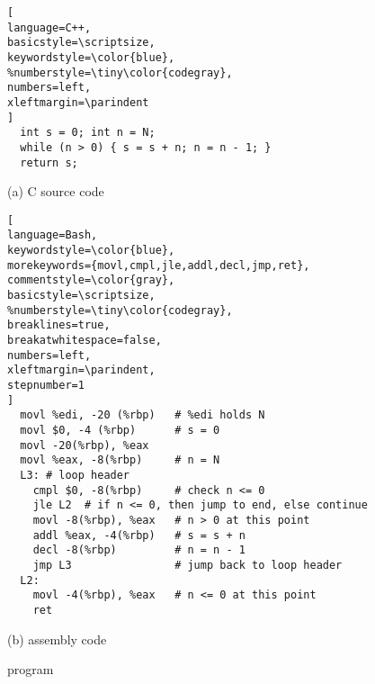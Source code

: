 \begin{figure}
\begin{lstlisting}[
language=C++, 
basicstyle=\scriptsize,
keywordstyle=\color{blue},
%numberstyle=\tiny\color{codegray},
numbers=left,
xleftmargin=\parindent
]
  int s = 0; int n = N;
  while (n > 0) { s = s + n; n = n - 1; }
  return s;
\end{lstlisting}
\vspace{-10pt}
\begin{center}
{\small (a) C source code}
\end{center}
\begin{lstlisting}[
language=Bash,
keywordstyle=\color{blue},
morekeywords={movl,cmpl,jle,addl,decl,jmp,ret},
commentstyle=\color{gray},
basicstyle=\scriptsize,
%numberstyle=\tiny\color{codegray},
breaklines=true,
breakatwhitespace=false,
numbers=left,
xleftmargin=\parindent,
stepnumber=1
]
  movl %edi, -20 (%rbp)   # %edi holds N
  movl $0, -4 (%rbp)      # s = 0
  movl -20(%rbp), %eax
  movl %eax, -8(%rbp)     # n = N
  L3: # loop header  
    cmpl $0, -8(%rbp)     # check n <= 0
    jle L2  # if n <= 0, then jump to end, else continue
    movl -8(%rbp), %eax   # n > 0 at this point
    addl %eax, -4(%rbp)   # s = s + n
    decl -8(%rbp)         # n = n - 1
    jmp L3                # jump back to loop header
  L2:
    movl -4(%rbp), %eax   # n <= 0 at this point
    ret
\end{lstlisting}
\vspace{-15pt}
\begin{center}
{\small (b) \ISA assembly code}
\end{center}
\caption{ program}
\label{fig:sum2n}
\end{figure}

